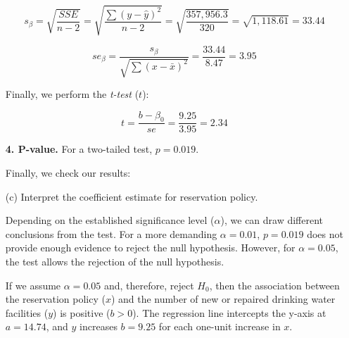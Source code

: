 \documentclass[12pt,letterpaper]{article}
\begin{document}
\begin{enumerate}
	$$s_\beta = \sqrt{\frac{SSE}{n-2}} = \sqrt{\frac{\sum(y-\hat{y})^2}{n-2}} = \sqrt{\frac{357,956.3}{320}} = \sqrt{1,118.61} = 33.44$$
	
	$$se_\beta = \frac{s_\beta}{\sqrt{\sum (x-\bar{x})^2}} = \frac{33.44}{8.47} = 3.95$$
	
		
	
	Finally, we perform the \textit{t-test} ($t$):
	
	$$t = \frac{b-\beta_0}{se} = \frac{9.25}{3.95} = 2.34$$

		
		
	\textbf{4. P-value.} For a two-tailed test, $p=0.019$.

		
	
	Finally, we check our results:

		

	\item [(c)] Interpret the coefficient estimate for reservation policy.
	
	Depending on the established significance level ($\alpha$), we can draw different conclusions from the test. For a more demanding $\alpha=0.01$, $p=0.019$ does not provide enough evidence to reject the null hypothesis. However, for $\alpha=0.05$, the test allows the rejection of the null hypothesis.
	
	If we assume $\alpha=0.05$ and, therefore, reject $H_0$, then the association between the reservation policy ($x$) and the number of new or repaired drinking water facilities ($y$) is positive ($b>0$). The regression line intercepts the y-axis at $a=14.74$, and $y$ increases $b=9.25$ for each one-unit increase in $x$.

	\end{enumerate}
\end{document}
